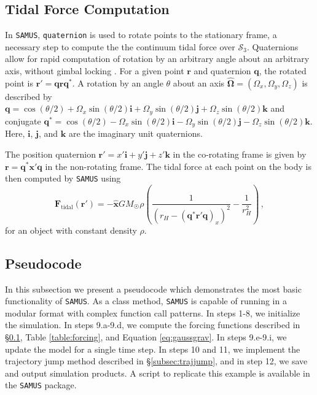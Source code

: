 \documentclass[twocolumn,doublespacing]{aastex631}
\begin{document}
 \subsection{Tidal Force Computation}\label{subsec:SAMUStidalforce}
 
 In \texttt{SAMUS}, \texttt{quaternion} is used to rotate points to the stationary frame, a necessary step to compute the the continuum tidal force over $\mathcal{S}_3$. Quaternions allow for rapid computation of rotation by an arbitrary angle about an arbitrary axis, without gimbal locking \citep{kuipers2007}. For a given point $\boldsymbol{r}$ and quaternion $\boldsymbol{q}$, the rotated point is $\boldsymbol{r}'=\boldsymbol{q}\boldsymbol{r}\boldsymbol{q}^*$. A rotation by an angle $\theta$ about an axis $\boldsymbol{\hat{\Omega}}=(\Omega_x,\Omega_y,\Omega_z)$ is described by $\boldsymbol{q}=\cos{(\theta/2)}+\Omega_x\sin{(\theta/2)}\boldsymbol{i}+\Omega_y\sin{(\theta/2)}\boldsymbol{j}+\Omega_z\sin{(\theta/2)}\boldsymbol{k}$ and conjugate $\boldsymbol{q^*}=\cos{(\theta/2)}-\Omega_x\sin{(\theta/2)}\boldsymbol{i}-\Omega_y\sin{(\theta/2)}\boldsymbol{j}-\Omega_z\sin{(\theta/2)}\boldsymbol{k}$. Here, $\boldsymbol{i}$, $\boldsymbol{j}$, and $\boldsymbol{k}$ are the imaginary unit quaternions. 
 

 The position quaternion $\boldsymbol{r}'=x'\boldsymbol{i}+y'\boldsymbol{j}+z'\boldsymbol{k}$ in the co-rotating frame is given by $\boldsymbol{r}=\boldsymbol{q^*}\boldsymbol{x'}\boldsymbol{q}$ in the non-rotating frame. The tidal force at each point on the body is then computed by \texttt{SAMUS} using 
\begin{equation}\label{eq:samustide}
    \boldsymbol{F}_{\text{tidal}}(\boldsymbol{r}')=-\boldsymbol{\hat{x}}GM_{\Sun}\rho\left(\frac{1}{(r_H-(\boldsymbol{q^*}\boldsymbol{r}'\boldsymbol{q})_x)^2}-\frac{1}{r_H^2}\right)\,,
\end{equation}
for an object with constant density $\rho$. 
 
\subsection{Pseudocode}
 
In this subsection we present a pseudocode which demonstrates the most basic functionality of \texttt{SAMUS}. As a class method, \texttt{SAMUS} is capable of running in a modular format with complex function call patterns. In steps 1-8, we initialize the simulation. In steps 9.a-9.d, we compute the forcing functions described in \S\ref{subsec:SAMUStidalforce}, Table \ref{table:forcing}, and Equation \ref{eq:gaussgrav}. In steps 9.e-9.i, we update the model for a single time step. In steps 10 and 11, we implement the trajectory jump method described in \S\ref{subsec:trajjump}, and in step 12, we save and output simulation products. A script to replicate this example is available in the \texttt{SAMUS} package. 
\end{document}

